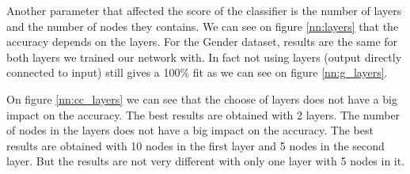 \documentclass[10pt]{article}
\begin{document}
			Another parameter that affected the score of the classifier is the number of layers and the number of nodes they contains. We can see on figure \ref{nn:layers} that the accuracy depends on the layers. For the Gender dataset, results are the same for both layers we trained our network with. In fact not using layers (output directly connected to input) still gives a 100\% fit as we can see on figure \ref{nn:g_layers}.

			On figure \ref{nn:cc_layers} we can see that the choose of layers does not have a big impact on the accuracy. The best results are obtained with 2 layers. The number of nodes in the layers does not have a big impact on the accuracy. The best results are obtained with 10 nodes in the first layer and 5 nodes in the second layer. But the results are not very different with only one layer with 5 nodes in it.
\end{document}
